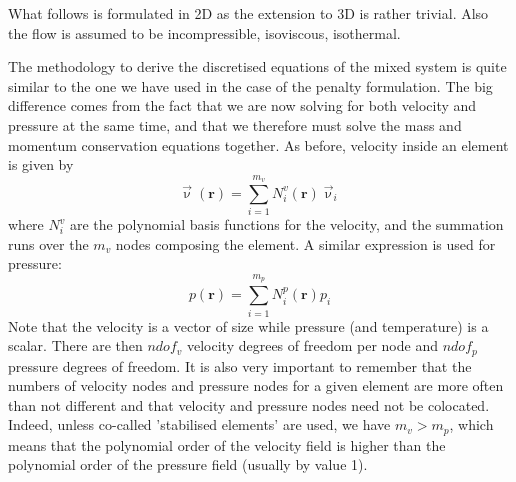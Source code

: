 \label{sec_mixed}

What follows is formulated in 2D as the extension to 3D is 
rather trivial. Also the flow is assumed to be incompressible, 
isoviscous, isothermal. 

The methodology to derive the discretised equations of the mixed system is 
quite similar to the one we have used in the case of the penalty formulation.
The big difference comes from the fact that we are now solving for both 
velocity and pressure at the same time, and that we therefore must solve 
the mass and momentum conservation equations together.
As before, velocity inside an element is given by 
\begin{equation}
{\vec \upnu}({\bm r})=\sum_{i=1}^{m_v} N_i^v({\bm r}) {\vec \upnu}_i
\label{mixed01}
\end{equation}
where $N_i^{v}$ are the polynomial basis functions for the velocity,
and the summation runs over the $m_v$ nodes composing the element.
A similar expression is used for pressure:
\begin{equation}
p({\bm r})=\sum_{i=1}^{m_p} N_i^p({\bm r}) p_i
\label{mixed02}
\end{equation}
Note that the velocity is a vector of size while pressure (and temperature)
is a scalar. There are then $ndof_v$ velocity degrees of freedom per node
and $ndof_p$ pressure degrees of freedom.
It is also very important to remember that the numbers of 
velocity nodes and pressure nodes for a given element 
are more often than not different and that velocity and pressure
nodes need not be colocated. Indeed, unless 
co-called 'stabilised elements' are used, we have $m_v>m_p$, which 
means that the polynomial order of the velocity field is higher than 
the polynomial order of the pressure field (usually by value 1).


